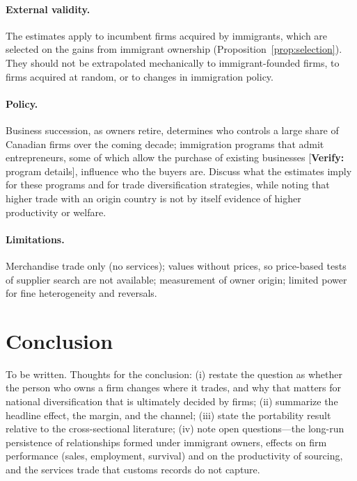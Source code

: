 \documentclass[12pt]{article}
\theoremstyle{remark}
\newcommand{\verify}[1]{\textcolor{BrickRed}{[\textbf{Verify:} #1]}}
\newcommand{\planned}[1]{\textcolor{OliveGreen}{#1}}
\begin{document}
\paragraph{External validity.} \planned{The estimates apply to incumbent firms
acquired by immigrants, which are selected on the gains from immigrant
ownership (Proposition~\ref{prop:selection}). They should not be extrapolated
mechanically to immigrant-founded firms, to firms acquired at random, or to
changes in immigration policy.}

\paragraph{Policy.} \planned{Business succession, as owners retire, determines
who controls a large share of Canadian firms over the coming decade;
immigration programs that admit entrepreneurs, some of which allow the purchase
of existing businesses \verify{program details}, influence who the buyers are.
Discuss what the estimates imply for these programs and for trade
diversification strategies, while noting that higher trade with an origin
country is not by itself evidence of higher productivity or welfare.}

\paragraph{Limitations.} \planned{Merchandise trade only (no services); values
without prices, so price-based tests of supplier search are not available;
measurement of owner origin; limited power for fine heterogeneity and
reversals.}

\section{Conclusion}
\label{sec:conclusion}

\planned{To be written. Thoughts for the conclusion: (i) restate the question
as whether the person who owns a firm changes where it trades, and why that
matters for national diversification that is ultimately decided by firms;
(ii) summarize the headline effect, the margin, and the channel; (iii) state
the portability result relative to the cross-sectional literature; (iv) note
open questions---the long-run persistence of relationships formed under
immigrant owners, effects on firm performance (sales, employment, survival)
and on the productivity of sourcing, and the services trade that customs
records do not capture.}
\end{document}
